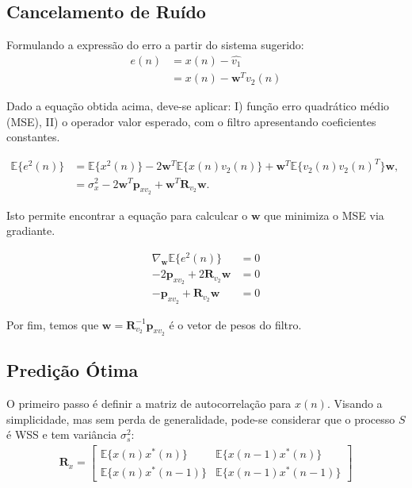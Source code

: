 \subsection{Cancelamento de Ruído} %

Formulando a expressão do erro a partir do sistema sugerido:
\begin{align*}
    e(n) &= x(n) - \hat{v_{1}} \\
    &= x(n) - \mathbf{w}^{T}v_{2}(n)
\end{align*}

Dado a equação obtida acima, deve-se aplicar: I) função erro quadrático médio (MSE), II) o operador valor esperado, com o filtro apresentando coeficientes constantes.

\begin{align*}
    \mathbb{E}\{e^{2}(n)\} &= \mathbb{E}\{x^{2}(n)\} - 2\mathbf{w}^{T}\mathbb{E}\{x(n) v_{2}(n)\} + \mathbf{w}^{T}\mathbb{E}\{v_{2}(n)v_{2}(n)^{T}\} \mathbf{w},& \\
    &= \sigma^{2}_{x} - 2\mathbf{w}^{T}\mathbf{p}_{xv_{2}} + \mathbf{w}^{T}\mathbf{R}_{v_{2}} \mathbf{w}.&
\end{align*}

Isto permite encontrar a equação para calculcar o $\mathbf{w}$ que minimiza o MSE via gradiante.

\begin{align*}
    \nabla_{\mathbf{w}} \mathbb{E}\{e^{2}(n)\} &= 0 \\
    - 2\mathbf{p}_{xv_{2}} + 2\mathbf{R}_{v_{2}} \mathbf{w} &= 0  \\
    -\mathbf{p}_{xv_{2}} + \mathbf{R}_{v_{2}} \mathbf{w} &= 0
\end{align*}

Por fim, temos que $\mathbf{w} = \mathbf{R}_{v_{2}}^{-1} \mathbf{p}_{xv_{2}}$ é o vetor de pesos do filtro.


\subsection{Predição Ótima} %

O primeiro passo é definir a matriz de autocorrelação para $x(n)$. Visando a simplicidade, mas sem perda de generalidade, pode-se considerar que o processo $S$ é WSS e tem variância $\sigma^{2}_{s}$:
\begin{align*} 
    \mathbf{R}_{x} = 
    \begin{bmatrix}
        \mathbb{E}\{x(n)x^{*}(n)\} & \mathbb{E}\{x(n-1)x^{*}(n)\} \\
        \mathbb{E}\{x(n)x^{*}(n-1)\}  & \mathbb{E}\{x(n-1)x^{*}(n-1)\} 
    \end{bmatrix}
\end{align*}

